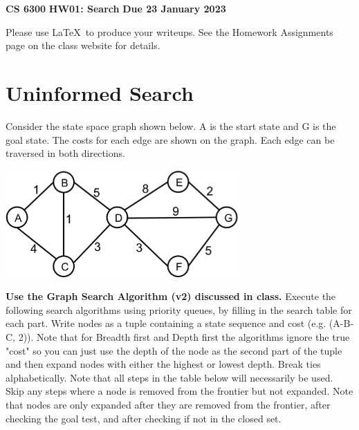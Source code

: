 \documentclass[11pt]{article}
\begin{document}
\thispagestyle{empty}

\begin{center}
{\bf CS 6300} \hfill {\large\bf HW01:  Search} \hfill {\bf Due 23 January 2023}
\end{center}

Please use \LaTeX\ to produce your writeups. See the Homework Assignments 
page on the class website for details.

\section{Uninformed Search}

Consider the state space graph shown below.  A is the start state and
G is the goal state. The costs for each edge are shown on the graph.
Each edge can be traversed in both directions.

\begin{center}
\includegraphics[width=3.5in]{search_graph.eps}
\end{center}

\textbf{Use the Graph Search Algorithm (v2) discussed in class.}
Execute the following search algorithms using priority queues, by
filling in the search table for each part. Write nodes as a tuple containing a state sequence and cost (e.g. (A-B-C, 2)). Note that for Breadth first and Depth first the algorithms ignore the true "cost" so you can just use the depth of the node as the second part of the tuple and then expand nodes with either the highest or lowest depth. Break ties alphabetically.  Note that all steps in the table below will
necessarily be used. Skip any steps where a node is removed from the frontier but not expanded. Note that nodes are only expanded after they are removed from the frontier, after checking the goal test, and after checking if not in the closed set.
\end{document}
